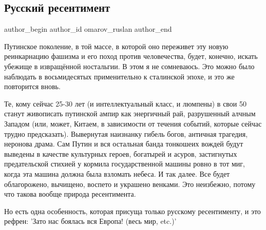  
 
 
 
 
 
\subsection{Русский ресентимент}
\label{sec:30_03_2022.fb.omarov_ruslan.1.russkij_ressentiment}
 
\ifcmt
 author_begin
   author_id omarov_ruslan
 author_end
\fi

Путинское поколение, в той массе, в которой оно переживет эту новую
реинкарнацию фашизма и его поход против человечества, будет, конечно, искать
убежище в извращённой ностальгии. В этом я не сомневаюсь. Это можно было
наблюдать в восьмидесятых применительно к сталинской эпохе, и это же повторится
вновь. 

Те, кому сейчас 25-30 лет (и интеллектуальный класс, и люмпены) в свои 50
станут живописать  путинской ампир как энергичный рай, разрушенный алчным
Западом (или, может, Китаем, в зависимости от течения событий, которые сейчас
трудно предсказать). Вывернутая наизнанку гибель богов, античная трагедия,
неронова драма. Сам Путин и вся остальная банда тонкошеих вождей будут выведены
в качестве культурных героев, богатырей и асуров, застигнутых предательской
стихией у кормила государственной машины ровно в тот миг, когда эта машина
должна была взломать небеса. И так далее. Все будет облагорожено, вычищено,
воспето и украшено венками. Это неизбежно, потому что такова вообще природа
ресентимента. 

Но есть одна особенность, которая присуща только русскому ресентименту, и это
рефрен: 'Зато нас боялась вся Европа! (весь мир, etc.)' 

